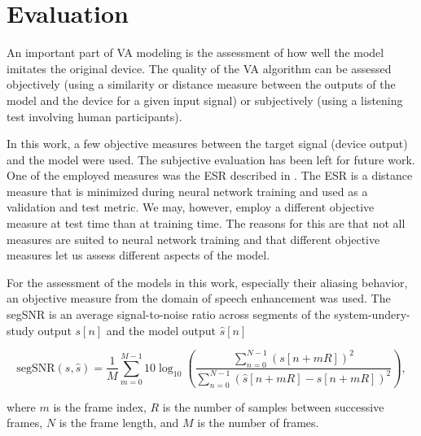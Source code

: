 \section{Evaluation}
\label{subsec:va_evaluation}

An important part of \ac{VA} modeling is the assessment of how well the model imitates the original device. The quality of the \ac{VA} algorithm can be assessed objectively (using a similarity or distance measure between the outputs of the model and the device for a given input signal) or subjectively (using a listening test involving human participants). 

In this work, a few objective measures between the target signal (device output) and the model were used. The subjective evaluation has been left for future work. One of the employed measures was the \ac{ESR} described in .
The \ac{ESR} is a distance measure that is minimized during neural network training and used as a validation and test metric. We may, however, employ a different objective measure at test time than at training time. The reasons for this are that not all measures are suited to neural network training and that different objective measures let us assess different aspects of the model.

For the assessment of the models in this work, especially their aliasing behavior, an objective measure from the domain of speech enhancement was used. The \ac{segSNR} is an average signal-to-noise ratio across segments of the system-undery-study output $s[n]$ and the model output $\hat{s}[n]$ \cite{Hansen98}

\begin{equation}
    \text{segSNR}(s, \hat{s}) = \frac{1}{M} \sum \limits_{m=0}^{M-1} 10 \log_{10} \left( \frac{\sum_{n=0}^{N-1} (s[n+mR])^2}{\sum_{n=0}^{N-1} (\hat{s}[n+mR] - s[n+mR])^2} \right),
    \label{eq:seg_snr}
\end{equation}

where $m$ is the frame index, $R$ is the number of samples between successive frames, $N$ is the frame length, and $M$ is the number of frames.



